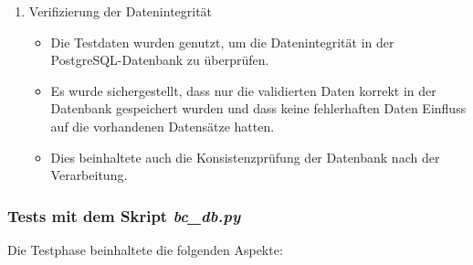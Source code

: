 \begin{enumerate}
\begin{itemize}
    \end{itemize}
    \item Verifizierung der Datenintegrität
    \begin{itemize}
        \item Die Testdaten wurden genutzt, um die Datenintegrität in der PostgreSQL-Datenbank zu überprüfen.
        \item Es wurde sichergestellt, dass nur die validierten Daten korrekt in der Datenbank gespeichert wurden und dass keine fehlerhaften Daten Einfluss auf die vorhandenen Datensätze hatten.
        \item Dies beinhaltete auch die Konsistenzprüfung der Datenbank nach der Verarbeitung.
    \end{itemize}
\end{enumerate}

\subsubsection{Tests mit dem Skript \textit{bc\_db.py}}
\label{sec:Tests mit dem Skript bc_db.py}

Die Testphase beinhaltete die folgenden Aspekte:

